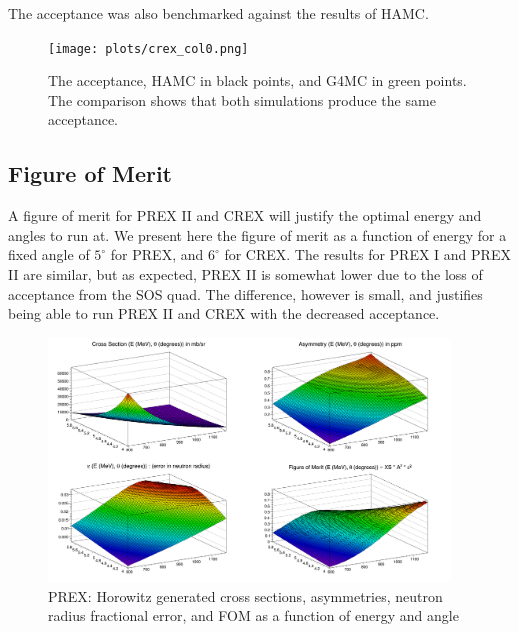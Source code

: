 \documentclass[11pt]{amsart}
\begin{document}
The acceptance was also benchmarked against the results of HAMC.

\FloatBarrier
\begin{figure}
  \texttt{[image: plots/crex\_col0.png]}
  \caption{The acceptance, HAMC in black points, and G4MC in green points. The comparison shows that both simulations produce the same acceptance.}
\end{figure}
\FloatBarrier

\subsection{ Figure of Merit }

A figure of merit for PREX II and CREX will justify the optimal energy and angles to run at. We present here the figure of merit as a function of energy for a fixed angle of $5^\circ$ for PREX, and $6^\circ$ for CREX. The results for PREX I and PREX II are similar, but as expected, PREX II is somewhat lower due to the loss of acceptance from the SOS quad. The difference, however is small, and justifies being able to run PREX II and CREX with the decreased acceptance.

\FloatBarrier
\begin{figure}
  \includegraphics[width=0.95\textwidth]{plots/contour_p.png}
  \caption{PREX: Horowitz generated cross sections, asymmetries, neutron radius fractional error, and FOM as a function of energy and angle}
\end{figure}
\end{document}
